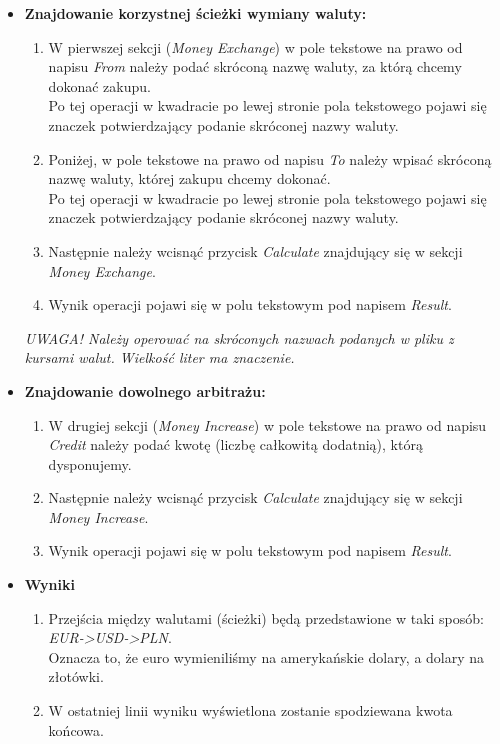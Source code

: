 \documentclass[a4paper,11pt]{article}
\begin{document}
\begin{itemize}
\item  \textbf{Znajdowanie korzystnej ścieżki wymiany waluty:}
\begin{enumerate}
\item W pierwszej sekcji (\textit{Money Exchange}) w pole tekstowe na prawo od napisu \textit{From} należy podać skróconą nazwę waluty, za którą chcemy dokonać zakupu.
\\ Po tej operacji w kwadracie po lewej stronie pola tekstowego pojawi się znaczek potwierdzający podanie skróconej nazwy waluty.
\item Poniżej, w pole tekstowe na prawo od napisu \textit{To} należy wpisać skróconą nazwę waluty, której zakupu chcemy dokonać.
\\ Po tej operacji w kwadracie po lewej stronie pola tekstowego pojawi się znaczek potwierdzający podanie skróconej nazwy waluty.
\item Następnie należy wcisnąć przycisk \textit{Calculate} znajdujący się w sekcji \textit{Money Exchange}.
\item Wynik operacji pojawi się w polu tekstowym pod napisem \textit{Result}.
\end{enumerate}
\textit{UWAGA! Należy operować na skróconych nazwach podanych w pliku z kursami walut. Wielkość liter ma znaczenie.}
\item  \textbf{Znajdowanie dowolnego arbitrażu:}
\begin{enumerate}
\item W drugiej sekcji (\textit{Money Increase}) w pole tekstowe na prawo od napisu \textit{Credit} należy podać kwotę (liczbę całkowitą dodatnią), którą dysponujemy.
\item Następnie należy wcisnąć przycisk \textit{Calculate} znajdujący się w sekcji \textit{Money Increase}.
\item Wynik operacji pojawi się w polu tekstowym pod napisem \textit{Result}.
\end{enumerate}
\item\textbf{ Wyniki}
\begin{enumerate}
\item Przejścia między walutami (ścieżki) będą przedstawione w taki sposób: \emph{EUR->USD->PLN}.
\\Oznacza to, że euro wymieniliśmy na amerykańskie dolary, a dolary na złotówki.
\item W ostatniej linii wyniku wyświetlona zostanie spodziewana kwota końcowa.
\end{enumerate}
\end{itemize}
\end{document}
